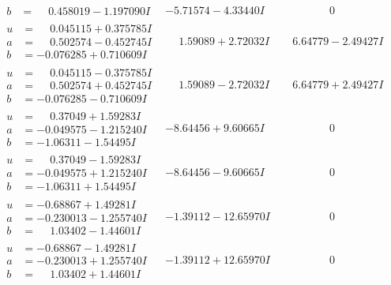 \documentclass[1p]{elsarticle_modified}
\theoremstyle{definition}
\begin{document}
$$\begin{array}{c|c|c}
\begin{aligned}
b &= \phantom{-}0.458019 - 1.197090 I\end{aligned}
 & -5.71574 - 4.33440 I & \phantom{-0.000000 } 0 \\ \hline\begin{aligned}
u &= \phantom{-}0.045115 + 0.375785 I \\
a &= \phantom{-}0.502574 - 0.452745 I \\
b &= -0.076285 + 0.710609 I\end{aligned}
 & \phantom{-}1.59089 + 2.72032 I & \phantom{-}6.64779 - 2.49427 I \\ \hline\begin{aligned}
u &= \phantom{-}0.045115 - 0.375785 I \\
a &= \phantom{-}0.502574 + 0.452745 I \\
b &= -0.076285 - 0.710609 I\end{aligned}
 & \phantom{-}1.59089 - 2.72032 I & \phantom{-}6.64779 + 2.49427 I \\ \hline\begin{aligned}
u &= \phantom{-}0.37049 + 1.59283 I \\
a &= -0.049575 - 1.215240 I \\
b &= -1.06311 - 1.54495 I\end{aligned}
 & -8.64456 + 9.60665 I & \phantom{-0.000000 } 0 \\ \hline\begin{aligned}
u &= \phantom{-}0.37049 - 1.59283 I \\
a &= -0.049575 + 1.215240 I \\
b &= -1.06311 + 1.54495 I\end{aligned}
 & -8.64456 - 9.60665 I & \phantom{-0.000000 } 0 \\ \hline\begin{aligned}
u &= -0.68867 + 1.49281 I \\
a &= -0.230013 - 1.255740 I \\
b &= \phantom{-}1.03402 - 1.44601 I\end{aligned}
 & -1.39112 - 12.65970 I & \phantom{-0.000000 } 0 \\ \hline\begin{aligned}
u &= -0.68867 - 1.49281 I \\
a &= -0.230013 + 1.255740 I \\
b &= \phantom{-}1.03402 + 1.44601 I\end{aligned}
 & -1.39112 + 12.65970 I & \phantom{-0.000000 } 0 \\ \hline\begin{aligned}

\end{aligned}
\end{array}$$
\end{document}
